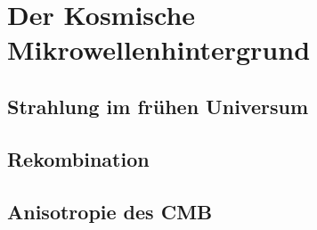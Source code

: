 %
%
%
\chapter{Der Kosmische Mikrowellenhintergrund}

\section{Strahlung im frühen Universum}

\section{Rekombination}

\section{Anisotropie des CMB}

